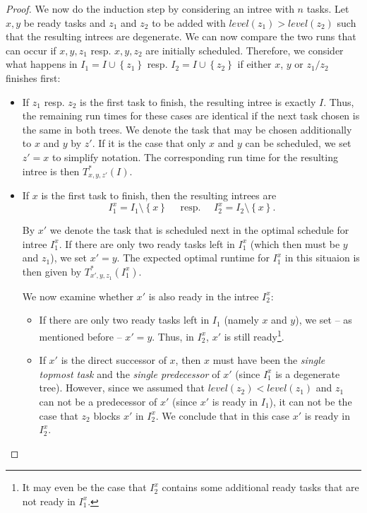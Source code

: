 \begin{proof}
  We now do the induction step by considering an intree with $n$ tasks. 
  Let $x,y$ be ready tasks and $z_1$ and $z_2$ to be added with $level(z_1) > level(z_2)$ such that the resulting intrees are degenerate.
  We can now compare the two runs that can occur if $x,y,z_1$ resp. $x,y,z_2$ are initially scheduled. 
  Therefore, we consider what happens in $I_1=I\cup\left\{ z_1 \right\}$ resp. $I_2=I\cup\left\{ z_2 \right\}$ if either $x$, $y$ or $z_1/z_2$ finishes first:

  \begin{itemize}
  \item If $z_1$ resp. $z_2$ is the first task to finish, the resulting intree is exactly $I$. Thus, the remaining run times for these cases are identical if the next task chosen is the same in both trees. We denote the task that may be chosen additionally to $x$ and $y$ by $z'$. If it is the case that only $x$ and $y$ can be scheduled, we set $z'=x$ to simplify notation. The corresponding run time for the resulting intree is then $T^*_{x,y,z'}(I)$.

  \item If $x$ is the first task to finish, then the resulting intrees are 
    \begin{equation*}
      I^x_{1}=I_1\setminus\left\{ x \right\} \quad \text{ resp. } \quad I^x_{2}=I_2\setminus\left\{ x \right\}.
    \end{equation*}

    By $x'$ we denote the task that is scheduled next in the optimal schedule for intree $I_1^x$. 
    If there are only two ready tasks left in $I_1^x$ (which then must be $y$ and $z_1$), we set $x'=y$. The expected optimal runtime for $I_1^x$ in this situaion is then given by $T_{x',y,z_1}^*(I_1^x)$.

    We now examine whether $x'$ is also ready in the intree $I_2^x$:
    \begin{itemize}
    \item If there are only two ready tasks left in $I_1$ (namely $x$ and $y$), we set -- as mentioned before -- $x'=y$. Thus, in $I_2^x$, $x'$ is still ready\footnote{It may even be the case that $I_2^x$ contains some additional ready tasks that are not ready in $I_1^x$.}.
    \item If $x'$ is the direct successor of $x$, then $x$ must have been the \emph{single topmost task} and the \emph{single predecessor} of $x'$ (since $I_1^x$ is a degenerate tree). However, since we assumed that $level(z_2)<level(z_1)$ and $z_1$ can not be a predecessor of $x'$ (since $x'$ is ready in $I_1$), it can not be the case that $z_2$ blocks $x'$ in $I_2^x$. We conclude that in this case $x'$ is ready in $I_2^x$.


\end{itemize}
\end{itemize}
\end{proof}
